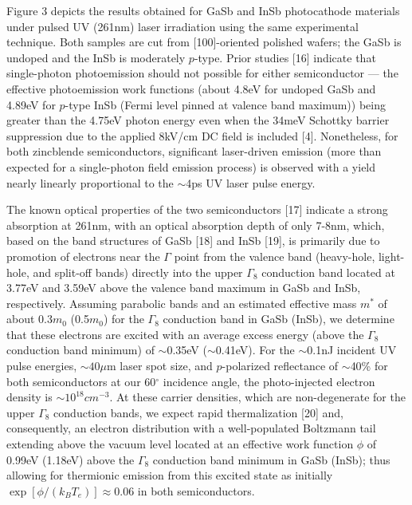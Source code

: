 Figure 3 depicts the results obtained for GaSb and InSb photocathode materials under pulsed UV (261nm) laser irradiation using the same experimental technique.
Both samples are cut from [100]-oriented polished wafers; the GaSb is undoped and the InSb is moderately $p$-type.
Prior studies [16] indicate that single-photon photoemission should not possible for either semiconductor --- the effective photoemission work functions (about 4.8eV for undoped GaSb and 4.89eV for $p$-type InSb (Fermi level pinned at valence band maximum)) being greater than the 4.75eV photon energy even when the 34meV Schottky barrier suppression due to the applied 8kV/cm DC field is included [4].
Nonetheless, for both zincblende semiconductors, significant laser-driven emission (more than expected for a single-photon field emission process) is observed with a yield nearly linearly proportional to the $\sim$4ps UV laser pulse energy.

The known optical properties of the two semiconductors [17] indicate a strong absorption at 261nm, with an optical absorption depth of only 7-8nm, which, based on the band structures of GaSb [18] and InSb [19], is primarily due to promotion of electrons near the $\Gamma$ point from the valence band (heavy-hole, light-hole, and split-off bands) directly into the upper $\Gamma_8$ conduction band located at 3.77eV and 3.59eV above the valence band maximum in GaSb and InSb, respectively.
Assuming parabolic bands and an estimated effective mass $m^*$ of about 0.3$m_0$ (0.5$m_0$) for the $\Gamma_8$ conduction band in GaSb (InSb), we determine that these electrons are excited with an average excess energy (above the $\Gamma_8$ conduction band minimum) of $\sim$0.35eV ($\sim$0.41eV).
For the $\sim$0.1nJ incident UV pulse energies, $\sim40\mu$m laser spot size, and $p$-polarized reflectance of $\sim$40\% for both semiconductors at our 60$^{\circ}$ incidence angle, the photo-injected electron density is $\sim10^{18}cm^{-3}$.
At these carrier densities, which are non-degenerate for the upper $\Gamma_8$ conduction bands, we expect rapid thermalization [20] and, consequently, an electron distribution with a well-populated Boltzmann tail extending above the vacuum level located at an effective work function $\phi$ of 0.99eV (1.18eV) above the $\Gamma_8$ conduction band minimum in GaSb (InSb); thus allowing for thermionic emission from this excited state as initially $\exp[\phi/(k_B T_e)] \approx 0.06$ in both semiconductors.  

